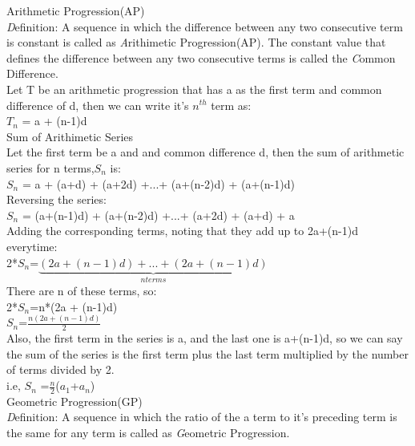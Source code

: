 \documentclass{article}
\begin{document}
 {\Large Arithmetic Progression(AP)}
 \vspace{2mm}
 \\
 {\emph Definition:} \hspace{2mm}A sequence in which the difference between any two consecutive term is constant is called as {\emph Arithimetic Progression(AP)}.
 The constant value that defines the difference between any two consecutive terms is called the {\emph Common Difference}.
 \\ Let T be an arithmetic progression that has a as the first term and common difference of d, then we can write it's $n^{th}$ term as:
 \\$T_{n}$ = a + (n-1)d
\vspace{4mm} \\ 
 {\large Sum of Arithimetic Series}
 \vspace{2mm}
\\Let the first term be a and and common difference d, then the sum of arithmetic series for n terms,$S_{n}$ is:
\\$S_{n}$ = a + (a+d) + (a+2d) +...+ (a+(n-2)d) + (a+(n-1)d) 
\\Reversing the series:
\\$S_{n}$ = (a+(n-1)d) + (a+(n-2)d) +...+ (a+2d) + (a+d) + a
\\Adding the corresponding terms, noting that they add up to 2a+(n-1)d everytime:
\\2*$S_{n}$=$\underbrace{(2a+(n-1)d) + ... + (2a+(n-1)d)}_{n terms}$
\\There are n of these terms, so:
\\ \vspace{0.8mm} 2*$S_{n}$=n*(2a + (n-1)d)
\\ \vspace{0.8mm} $S_{n}$=$\frac{n(2a + (n-1)d)}{2}$
\\Also, the first term in the series is a, and the last one is a+(n-1)d,
so we can say the sum of the series is the first term plus the last term multiplied by the number of terms divided by 2.
\\\vspace{0.8mm}i.e, $S_{n}$ =$\frac{n}{2}$($a_{1}$+$a_{n}$)
\vspace{5mm}
\\
{\Large Geometric Progression(GP)}
 \vspace{2mm}
 \\
 {\emph Definition:} \hspace{2mm} A sequence in which the ratio of the a term to it's preceding term is the same for any term is called as {\emph Geometric Progression}. 
\end{document}
